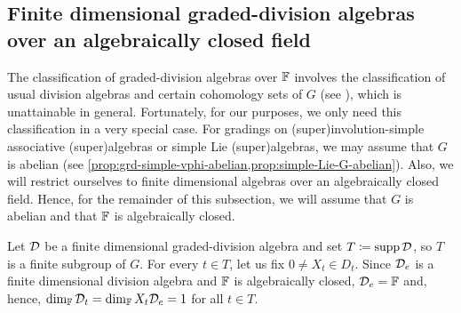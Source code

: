 




\subsection{Finite dimensional graded-division algebras over an algebraically closed field}\label{ssec:grd-div-alg}

The classification of graded-division algebras over $\mathbb{F}$ involves the classification of usual division algebras and certain cohomology sets of $G$ (see \cite{Guido}), which is unattainable in general. 
Fortunately, for our purposes, we only need this classification in a very special case. 
For gradings on (super)involution-simple associative (super)algebras or simple Lie (super)algebras, we may assume that $G$ is abelian (see \cref{prop:grd-simple-vphi-abelian,prop:simple-Lie-G-abelian}). 
Also, we will restrict ourselves to finite dimensional algebras over an algebraically closed field. 
Hence, for the remainder of this subsection, we will assume that $G$ is abelian and that $\mathbb{F}$ is algebraically closed.

Let $\mathcal{D}$ be a finite dimensional graded-division algebra and set $T \coloneqq \operatorname{supp} \mathcal{D}$, so $T$ is a finite subgroup of $G$.
For every $t\in T$, let us fix $0 \neq X_t\in D_t$. 
Since $\mathcal{D}_e$ is a finite dimensional division algebra and $\mathbb{F}$ is algebraically closed, $\mathcal{D}_e = \mathbb{F}$ and, hence, $\dim_{\mathbb{F}} \mathcal{D}_t = \dim_{\mathbb{F}} X_t\mathcal{D}_e = 1$ for all $t\in T$. 

